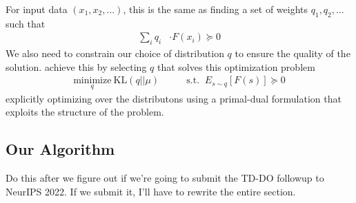 \documentclass[11pt]{article}
\begin{document}
For input data $(x_1, x_2, \ldots)$, this is the same as finding a set of weights $q_1, q_2, \ldots$ such that
\begin{align}
\sum_i q_i & \cdot F(x_i) \succcurlyeq 0
\end{align}
We also need to constrain our choice of distribution $q$ to ensure the quality of the solution. \citet{kolter2011fixed} achieve this by selecting $q$ that solves this optimization problem
\begin{align}
    \underset{q}{\text{minimize}}~\text{KL}(q||\mu) & \qquad \text{s.t. } ~ E_{s\sim q}[F(s)] \succcurlyeq 0
\end{align}
explicitly optimizing over the distributons using a primal-dual formulation that exploits the structure of the problem.

\subsection{Our Algorithm}

Do this after we figure out if we're going to submit the TD-DO followup to NeurIPS 2022. If we submit it, I'll have to rewrite the entire section.

\clearpage

\printbibliography

\clearpage

\appendix
\end{document}
